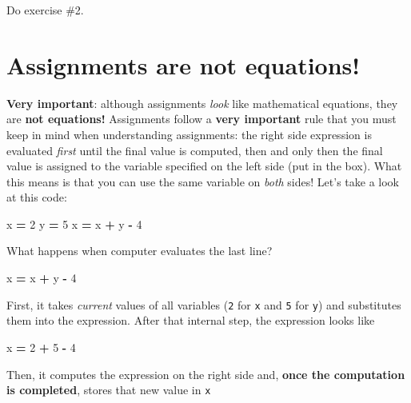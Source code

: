 \documentclass[
]{book}
\newenvironment{Shaded}{\begin{snugshade}}{\end{snugshade}}
\newcommand{\DecValTok}[1]{\textcolor[rgb]{0.00,0.00,0.81}{#1}}
\newcommand{\NormalTok}[1]{#1}
\newcommand{\OperatorTok}[1]{\textcolor[rgb]{0.81,0.36,0.00}{\textbf{#1}}}
\begin{document}
Do exercise \#2.

\hypertarget{assignments-are-not-equations}{%
\section{Assignments are not equations!}\label{assignments-are-not-equations}}

\textbf{Very important}: although assignments \emph{look} like mathematical equations, they are \textbf{not equations!} Assignments follow a \textbf{very important} rule that you must keep in mind when understanding assignments: the right side expression is evaluated \emph{first} until the final value is computed, then and only then the final value is assigned to the variable specified on the left side (put in the box). What this means is that you can use the same variable on \emph{both} sides! Let's take a look at this code:

\begin{Shaded}
\begin{Highlighting}[]
\NormalTok{x }\OperatorTok{=} \DecValTok{2}
\NormalTok{y }\OperatorTok{=} \DecValTok{5}
\NormalTok{x }\OperatorTok{=}\NormalTok{ x }\OperatorTok{+}\NormalTok{ y }\OperatorTok{{-}} \DecValTok{4}
\end{Highlighting}
\end{Shaded}

What happens when computer evaluates the last line?

\begin{Shaded}
\begin{Highlighting}[]
\NormalTok{x }\OperatorTok{=}\NormalTok{ x }\OperatorTok{+}\NormalTok{ y }\OperatorTok{{-}} \DecValTok{4}
\end{Highlighting}
\end{Shaded}

First, it takes \emph{current} values of all variables (\texttt{2} for \texttt{x} and \texttt{5} for \texttt{y}) and substitutes them into the expression. After that internal step, the expression looks like

\begin{Shaded}
\begin{Highlighting}[]
\NormalTok{x }\OperatorTok{=} \DecValTok{2} \OperatorTok{+} \DecValTok{5} \OperatorTok{{-}} \DecValTok{4}
\end{Highlighting}
\end{Shaded}

Then, it computes the expression on the right side and, \textbf{once the computation is completed}, stores that new value in \texttt{x}
\end{document}
